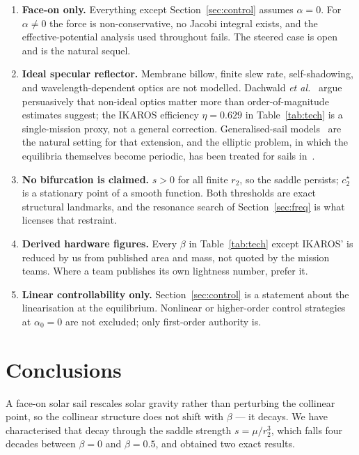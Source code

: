\documentclass[pdflatex,sn-mathphys-num]{sn-jnl}
\begin{document}
\begin{enumerate}
\item \textbf{Face-on only.} Everything except Section~\ref{sec:control} assumes
$\alpha=0$. For $\alpha\neq0$ the force is non-conservative, no Jacobi integral
exists, and the effective-potential analysis used throughout fails. The steered
case is open and is the natural sequel.

\item \textbf{Ideal specular reflector.} Membrane billow, finite slew rate,
self-shadowing, and wavelength-dependent optics are not modelled. Dachwald
\emph{et al.}~\cite{dachwald2013} argue persuasively that non-ideal optics matter
more than order-of-magnitude estimates suggest; the IKAROS efficiency
$\eta=0.629$ in Table~\ref{tab:tech} is a single-mission proxy, not a general
correction. Generalised-sail models~\cite{aliasi2011,aliasi2015} are the
natural setting for that extension, and the elliptic problem, in which the
equilibria themselves become periodic, has been treated for sails
in~\cite{aliasi2012,biggs2009}.

\item \textbf{No bifurcation is claimed.} $s>0$ for all finite $r_2$, so the
saddle persists; $c_2^\star$ is a stationary point of a smooth function. Both
thresholds are exact structural landmarks, and the resonance search of
Section~\ref{sec:freq} is what licenses that restraint.

\item \textbf{Derived hardware figures.} Every $\beta$ in Table~\ref{tab:tech}
except IKAROS' is reduced by us from published area and mass, not quoted by the
mission teams. Where a team publishes its own lightness number, prefer it.

\item \textbf{Linear controllability only.} Section~\ref{sec:control} is a
statement about the linearisation at the equilibrium. Nonlinear or
higher-order control strategies at $\alpha_0=0$ are not excluded; only
first-order authority is.
\end{enumerate}

\section{Conclusions}

A face-on solar sail rescales solar gravity rather than perturbing the collinear
point, so the collinear structure does not shift with $\beta$ --- it decays. We
have characterised that decay through the saddle strength $s=\mu/r_2^3$, which
falls four decades between $\beta=0$ and $\beta=0.5$, and obtained two exact
results.
\end{document}
